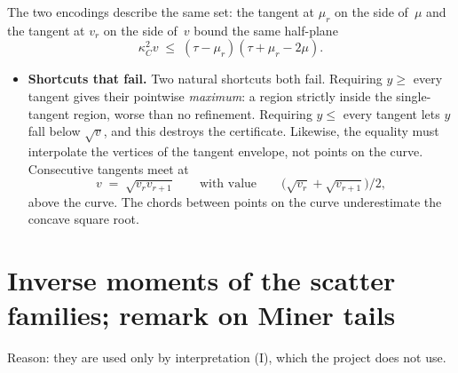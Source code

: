 \documentclass[11pt,a4paper]{article}
\theoremstyle{plain}
\theoremstyle{definition}
\theoremstyle{remark}
\begin{document}
    The two encodings describe the same set: the tangent at $\mu_r$ on the side of~$\mu$ and the tangent at $v_r$ on the side of~$v$ bound the same half-plane
    \begin{equation}
      \kappa_C^2 v \;\le\; (\tau - \mu_r)(\tau + \mu_r - 2\mu).
    \end{equation}

\begin{itemize}
  \item \textbf{Shortcuts that fail.} Two natural shortcuts both fail.
    Requiring $y \ge$ every tangent gives their pointwise \emph{maximum}: a region strictly inside the single-tangent region, worse than no refinement.
    Requiring $y \le$ every tangent lets $y$ fall below $\sqrt{v}$, and this destroys the certificate.
    Likewise, the equality must interpolate the vertices of the tangent envelope, not points on the curve.
    Consecutive tangents meet at
    \begin{equation}
      v \;=\; \sqrt{v_r v_{r+1}}
      \qquad\text{with value}\qquad
      \bigl(\sqrt{v_r} + \sqrt{v_{r+1}}\bigr)/2,
    \end{equation}
    above the curve.
    The chords between points on the curve underestimate the concave square root.
\end{itemize}

\section{Inverse moments of the scatter families; remark on Miner tails}

Reason: they are used only by interpretation (I), which the project does not use.
\end{document}
